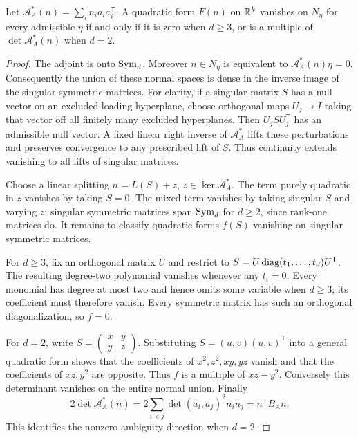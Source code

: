 \begin{lemma}\label{lem:determinantal-kernel}
Let $\mathcal A_A^*(n)=\sum_i n_i a_i a_i^{\mathsf T}$. A quadratic form $F(n)$ on $\mathbb R^k$ vanishes on $N_\eta$ for every admissible $\eta$ if and only if it is zero when $d\ge3$, or is a multiple of $\det\mathcal A_A^*(n)$ when $d=2$.
\end{lemma}
\begin{proof}
The adjoint is onto $\operatorname{Sym}_d$. Moreover $n\in N_\eta$ is equivalent to $\mathcal A_A^*(n)\eta=0$. Consequently the union of these normal spaces is dense in the inverse image of the singular symmetric matrices. For clarity, if a singular matrix $S$ has a null vector on an excluded loading hyperplane, choose orthogonal maps $U_j\to I$ taking that vector off all finitely many excluded hyperplanes. Then $U_jSU_j^{\mathsf T}$ has an admissible null vector. A fixed linear right inverse of $\mathcal A_A^*$ lifts these perturbations and preserves convergence to any prescribed lift of $S$. Thus continuity extends vanishing to all lifts of singular matrices.

Choose a linear splitting $n=L(S)+z$, $z\in\ker\mathcal A_A^*$. The term purely quadratic in $z$ vanishes by taking $S=0$. The mixed term vanishes by taking singular $S$ and varying $z$: singular symmetric matrices span $\operatorname{Sym}_d$ for $d\ge2$, since rank-one matrices do. It remains to classify quadratic forms $f(S)$ vanishing on singular symmetric matrices.

For $d\ge3$, fix an orthogonal matrix $U$ and restrict to $S=U\operatorname{diag}(t_1,\ldots,t_d)U^{\mathsf T}$. The resulting degree-two polynomial vanishes whenever any $t_i=0$. Every monomial has degree at most two and hence omits some variable when $d\ge3$; its coefficient must therefore vanish. Every symmetric matrix has such an orthogonal diagonalization, so $f=0$.

For $d=2$, write $S=\left(\begin{smallmatrix}x&y\\y&z\end{smallmatrix}\right)$. Substituting $S=(u,v)(u,v)^{\mathsf T}$ into a general quadratic form shows that the coefficients of $x^2,z^2,xy,yz$ vanish and that the coefficients of $xz,y^2$ are opposite. Thus $f$ is a multiple of $xz-y^2$. Conversely this determinant vanishes on the entire normal union. Finally
\[
 2\det\mathcal A_A^*(n)
   =2\sum_{i<j}\det(a_i,a_j)^2n_i n_j=n^{\mathsf T}B_A n.
\]
This identifies the nonzero ambiguity direction when $d=2$.
\end{proof}

